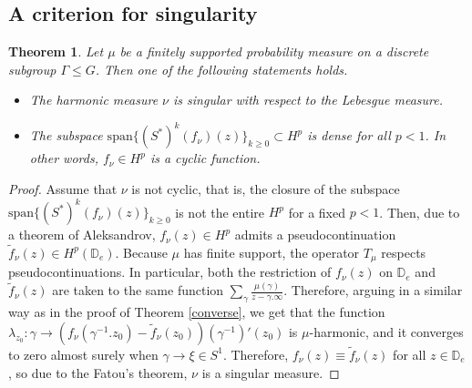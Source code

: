 \documentclass[11pt]{article}
\newtheorem{theorem}{Theorem}[section]
\begin{document}
\subsection{A criterion for singularity}
\label{The proof of the singularity conjecture}
\begin{theorem}
	Let $\mu$ be a finitely supported probability measure on a discrete subgroup $\Gamma \leq G$. Then one of the following statements holds.
	\begin{itemize}
		\item The harmonic measure $\nu$ is singular with respect to the Lebesgue measure.
		\item The subspace $\text{span}\{ (S^*)^k (f_\nu)(z) \}_{k \ge 0} \subset H^p$ is dense for all $p < 1$. In other words, $f_\nu \in H^p$ is a cyclic function.
	\end{itemize}
\end{theorem}
\begin{proof}
	Assume that $\nu$ is not cyclic, that is, the closure of the subspace $\text{span}\{ (S^*)^k (f_\nu)(z) \}_{k \ge 0}$ is not the entire $H^p$ for a fixed $p < 1$. Then, due to a theorem of Aleksandrov, $f_\nu(z) \in H^p$ admits a pseudocontinuation $\tilde{f}_\nu(z) \in H^p(\mathbb{D}_e)$. Because $\mu$ has finite support, the operator $T_\mu$ respects pseudocontinuations. In particular, both the restriction of $f_\nu(z)$ on $\mathbb{D}_e$ and $\tilde{f}_\nu(z)$ are taken to the same function $\sum_{\gamma} \frac{\mu(\gamma)}{z - \gamma.\infty}$. Therefore, arguing in a similar way as in the proof of Theorem \ref{converse}, we get that the function $\lambda_{z_0} : \gamma \rightarrow (f_\nu(\gamma^{-1}.z_0) - \tilde{f}_\nu(z_0)) (\gamma^{-1})'(z_0)$ is $\mu$-harmonic, and it converges to zero almost surely when $\gamma \rightarrow \xi \in S^1$. Therefore, $f_\nu(z) \equiv \tilde{f}_\nu(z)$ for all $z \in \mathbb{D}_e$, so due to the Fatou's theorem, $\nu$ is a singular measure.  
\end{proof}
\end{document}
